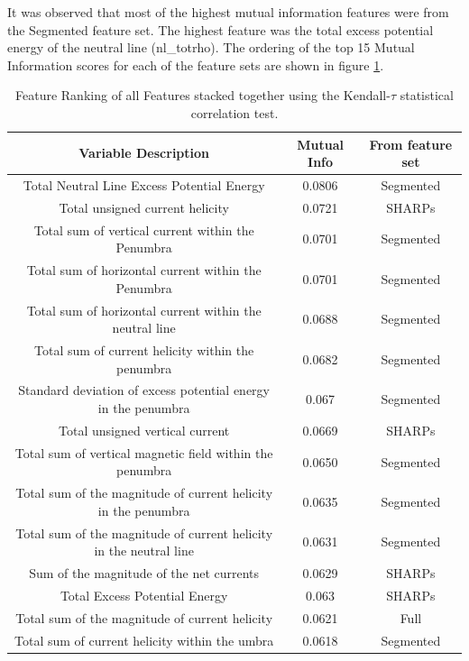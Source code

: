 \documentclass[defaultstyle,11pt]{thesis}
\begin{document}
It was observed that most of the highest mutual information features were from the Segmented feature set. The highest feature was the total excess potential energy of the neutral line (nl\_totrho). The ordering of the top 15 Mutual Information scores for each of the feature sets are shown in figure \ref{tbl:ftrank}.
\begin{table}
\begin{center}
\begin{tabular}{c|c|c}
     Variable Description & Mutual Info & From feature set \\
     \hline
     Total Neutral Line Excess Potential Energy & 0.0806 & Segmented \\
     Total unsigned current helicity & 0.0721 & SHARPs \\
     Total sum of vertical current within the Penumbra & 0.0701 & Segmented \\
     Total sum of horizontal current within the Penumbra & 0.0701 & Segmented \\
     Total sum of horizontal current within the neutral line & 0.0688 & Segmented \\
     Total sum of current helicity within the penumbra & 0.0682 & Segmented \\
     Standard deviation of excess potential energy in the penumbra & 0.067 & Segmented \\
     Total unsigned vertical current & 0.0669 & SHARPs \\
     Total sum of vertical magnetic field within the penumbra & 0.0650 & Segmented \\
     Total sum of the magnitude of current helicity in the penumbra & 0.0635 & Segmented \\
     Total sum of the magnitude of current helicity in the neutral line & 0.0631 & Segmented \\
     Sum of the magnitude of the net currents & 0.0629 & SHARPs \\
     Total Excess Potential Energy & 0.063 & SHARPs \\
     Total sum of the magnitude of current helicity & 0.0621 & Full \\
     Total sum of current helicity within the umbra & 0.0618 & Segmented
\end{tabular}
\caption{Feature Ranking of all Features stacked together using the Kendall-$\tau$ statistical correlation test.} 
\label{tbl:ftrank}
\end{center}
\end{table}
\end{document}
